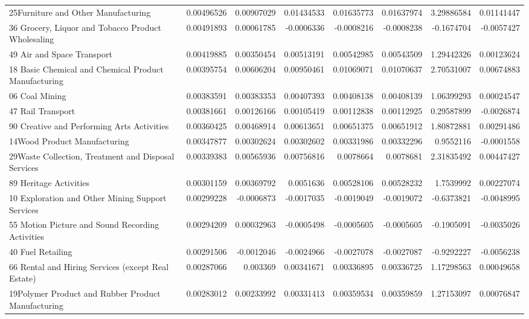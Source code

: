 \documentclass{monashthesis}
\begin{document}
\begin{table}[ht]
{\begin{tabular}{|l|r|rrrr|rr|}
    25Furniture and Other Manufacturing & 0.00496526 & 0.00907029 & 0.01434533 & 0.01635773 & 0.01637974 & 3.29886584 & 0.01141447 \\
    36 Grocery, Liquor and Tobacco Product Wholesaling & 0.00491893 & 0.00061785 & -0.0006336 & -0.0008216 & -0.0008238 & -0.1674704 & -0.0057427 \\
    49 Air and Space Transport & 0.00419885 & 0.00350454 & 0.00513191 & 0.00542985 & 0.00543509 & 1.29442326 & 0.00123624 \\
    18 Basic Chemical and Chemical Product Manufacturing & 0.00395754 & 0.00606204 & 0.00950461 & 0.01069071 & 0.01070637 & 2.70531007 & 0.00674883 \\
    06 Coal Mining & 0.00383591 & 0.00383353 & 0.00407393 & 0.00408138 & 0.00408139 & 1.06399293 & 0.00024547 \\
    47 Rail Transport & 0.00381661 & 0.00126166 & 0.00105419 & 0.00112838 & 0.00112925 & 0.29587899 & -0.0026874 \\
    90 Creative and Performing Arts Activities & 0.00360425 & 0.00468914 & 0.00613651 & 0.00651375 & 0.00651912 & 1.80872881 & 0.00291486 \\
    14Wood Product Manufacturing & 0.00347877 & 0.00302624 & 0.00302602 & 0.00331986 & 0.00332296 & 0.9552116 & -0.0001558 \\
    29Waste Collection, Treatment and Disposal Services & 0.00339383 & 0.00565936 & 0.00756816 & 0.0078664 & 0.0078681 & 2.31835492 & 0.00447427 \\
    89 Heritage Activities & 0.00301159 & 0.00369792 & 0.0051636 & 0.00528106 & 0.00528232 & 1.7539992 & 0.00227074 \\
    10 Exploration and Other Mining Support Services & 0.00299228 & -0.0006873 & -0.0017035 & -0.0019049 & -0.0019072 & -0.6373821 & -0.0048995 \\
    55 Motion Picture and Sound Recording Activities & 0.00294209 & 0.00032963 & -0.0005498 & -0.0005605 & -0.0005605 & -0.1905091 & -0.0035026 \\
    40 Fuel Retailing & 0.00291506 & -0.0012046 & -0.0024966 & -0.0027078 & -0.0027087 & -0.9292227 & -0.0056238 \\
    66 Rental and Hiring Services (except Real Estate) & 0.00287066 & 0.003369 & 0.00341671 & 0.00336895 & 0.00336725 & 1.17298563 & 0.00049658 \\
    19Polymer Product and Rubber Product Manufacturing & 0.00283012 & 0.00233992 & 0.00331413 & 0.00359534 & 0.00359859 & 1.27153097 & 0.00076847 \\

\end{tabular}}
\end{table}
\end{document}
